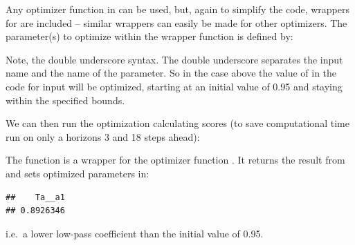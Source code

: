 \noindent Any optimizer function in \Rprog can be used, but, again to simplify the code, wrappers for  are
included -- similar wrappers can easily be made for other optimizers. The
parameter(s) to optimize within the wrapper function is defined by:
\begin{knitrout}
\color{fgcolor}\begin{kframe}
\begin{alltt}
\hlopt{\$}\hlstd{(} \hlstd{=} \hlstd{(}\hlstd{=}\hlstd{,} \hlstd{=}\hlstd{,} \hlstd{=}\hlstd{))}
\end{alltt}
\end{kframe}
\end{knitrout}
\noindent Note, the double underscore syntax. The double underscore separates
the input name and the name of the parameter. So in the case above the value of
 in the \Rprog code for input  will be optimized, starting at
an initial value of 0.95 and staying within the specified bounds.

We can then run the optimization calculating scores (to save computational time
run on only a horizons 3 and 18 steps ahead):
\begin{knitrout}
\color{fgcolor}\begin{kframe}
\begin{alltt}
 \hlstd{=}\hlstd{(}\hlstd{,}\hlstd{))}
\end{alltt}
\end{kframe}
\end{knitrout}
\noindent The  function is a wrapper for the \Rprog optimizer function
. It returns the result from  and sets optimized
parameters in:
\begin{knitrout}
\color{fgcolor}\begin{kframe}
\begin{alltt}
\hlopt{\$}
\end{alltt}
\begin{verbatim}
##    Ta__a1 
## 0.8926346
\end{verbatim}
\end{kframe}
\end{knitrout}
i.e.\ a lower low-pass coefficient than the initial value of 0.95.

